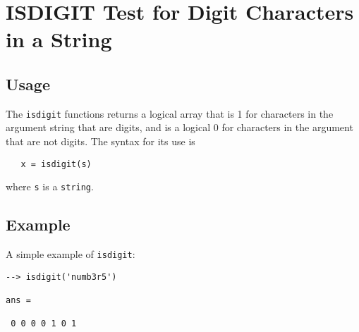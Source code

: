\section{ISDIGIT Test for Digit Characters in a String}

\subsection{Usage}

The \verb|isdigit| functions returns a logical array that is 1 
for characters in the argument string that are digits, and 
is a logical 0 for characters in the argument that are not
digits.  The syntax for its use is
\begin{verbatim}
   x = isdigit(s)
\end{verbatim}
where \verb|s| is a \verb|string|.  
\subsection{Example}

A simple example of \verb|isdigit|:
\begin{verbatim}
--> isdigit('numb3r5')

ans = 

 0 0 0 0 1 0 1 
\end{verbatim}
